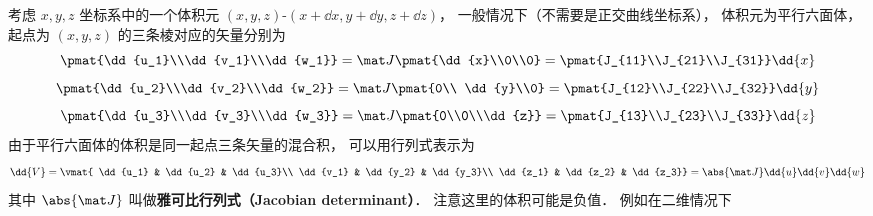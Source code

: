 考虑 $x,y,z$ 坐标系中的一个体积元 $(x,y,z)$-$(x+ \dd{x}, y + \dd{y}, z + \dd{z})$，  一般情况下（不需要是正交曲线坐标系）， 体积元为平行六面体， 起点为 $(x,y,z)$  的三条棱对应的矢量分别为
 \begin{equation}
\pmat{\dd{u_1}\\\dd{v_1}\\\dd{w_1}} = 
\mat J\pmat{\dd{x}\\0\\0} = 
\pmat{J_{11}\\J_{21}\\J_{31}} \dd{x}
\end{equation} 
\begin{equation}
\pmat{\dd{u_2}\\\dd{v_2}\\\dd{w_2}} = 
\mat J \pmat{0\\ \dd{y}\\0} = 
\pmat{J_{12}\\J_{22}\\J_{32}} \dd{y}
\end{equation} 
\begin{equation}
\pmat{\dd{u_3}\\\dd{v_3}\\\dd{w_3}} = 
\mat J \pmat{0\\0\\\dd{z}} = 
\pmat{J_{13}\\J_{23}\\J_{33}} \dd{z}
\end{equation} 
由于平行六面体的体积是同一起点三条矢量的混合积， 可以用行列式表示为
\begin{equation}
\dd{V}
= \vmat{
\dd{u_1} & \dd{u_2} & \dd{u_3}\\
\dd{v_1} & \dd{y_2} & \dd{y_3}\\
\dd{z_1} & \dd{z_2} & \dd{z_3}}
= \abs{\mat J} \dd{u}\dd{v}\dd{w}
\end{equation}
其中 $\abs{\mat J}$  叫做\textbf{雅可比行列式（Jacobian determinant）}． 注意这里的体积可能是负值． 例如在二维情况下

